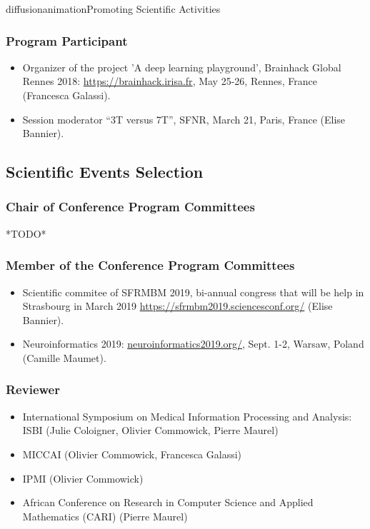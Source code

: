 \documentclass{ra2018}
\begin{document}
\begin{module}{diffusion}{animation}{Promoting Scientific Activities}
    \subsubsection{Program Participant}
    \begin{itemize}
        \item Organizer of the project 'A deep learning playground', Brainhack Global Rennes 2018: \url{https://brainhack.irisa.fr}, May 25-26, Rennes, France (Francesca Galassi).
        \item Session moderator ``3T versus 7T'', SFNR, March 21, Paris, France (Elise Bannier).
    \end{itemize}  
\subsection {Scientific Events Selection}
    \subsubsection{Chair of Conference Program Committees}
    *TODO*
    \subsubsection{Member of the Conference Program Committees}
    \begin{itemize}
        \item Scientific commitee of SFRMBM 2019, bi-annual congress that will be help in Strasbourg in March 2019 \url{https://sfrmbm2019.sciencesconf.org/} (Elise Bannier).
        \item Neuroinformatics 2019: \url{neuroinformatics2019.org/}, Sept. 1-2, Warsaw, Poland (Camille Maumet).
    \end{itemize}
    \subsubsection{Reviewer}
    \begin{itemize}
        \item International Symposium on Medical Information Processing and Analysis: ISBI (Julie Coloigner, Olivier Commowick, Pierre Maurel)
        \item MICCAI (Olivier Commowick, Francesca Galassi)
        \item IPMI (Olivier Commowick)
        \item African Conference on Research in Computer Science and Applied Mathematics (CARI) (Pierre Maurel)
    \end{itemize}   

\end{module}
\end{document}
